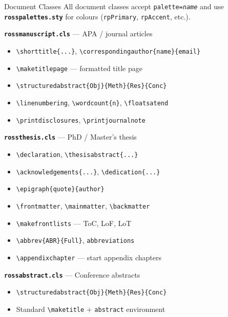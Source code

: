 \documentclass[palette=lancet]{rossbeamerscientific}
\newcommand{\cmd}[1]{\texttt{\color{rbAccent}\textbackslash #1}}
\newcommand{\env}[1]{\texttt{\color{rbSecondary}#1}}
\newcommand{\cls}[1]{\texttt{\color{rbPrimary}\bfseries #1}}
\newcommand{\opt}[1]{\texttt{\color{rbAccentDark}#1}}
\newcommand{\pkg}[1]{\texttt{\color{rbSecondary}\bfseries #1}}
\begin{document}
\begin{frame}{Document Classes}
\footnotesize
All document classes accept \opt{palette=\textit{name}} and use \pkg{rosspalettes.sty}
for colours (\texttt{rpPrimary}, \texttt{rpAccent}, etc.).
\vskip6pt
\begin{twocol}
  \textbf{\cls{rossmanuscript.cls}} --- APA / journal articles
  \begin{itemize}\setlength\itemsep{0pt}
    \item \cmd{shorttitle\{...\}}, \cmd{correspondingauthor\{name\}\{email\}}
    \item \cmd{maketitlepage} --- formatted title page
    \item \cmd{structuredabstract\{Obj\}\{Meth\}\{Res\}\{Conc\}}
    \item \cmd{linenumbering}, \cmd{wordcount\{n\}}, \cmd{floatsatend}
    \item \cmd{printdisclosures}, \cmd{printjournalnote}
  \end{itemize}
  \vskip6pt

  \textbf{\cls{rossthesis.cls}} --- PhD / Master's thesis
  \begin{itemize}\setlength\itemsep{0pt}
    \item \cmd{declaration}, \cmd{thesisabstract\{...\}}
    \item \cmd{acknowledgements\{...\}}, \cmd{dedication\{...\}}
    \item \cmd{epigraph\{quote\}\{author\}}
    \item \cmd{frontmatter}, \cmd{mainmatter}, \cmd{backmatter}
    \item \cmd{makefrontlists} --- ToC, LoF, LoT
    \item \cmd{abbrev\{ABR\}\{Full\}}, \env{abbreviations}
    \item \cmd{appendixchapter} --- start appendix chapters
  \end{itemize}
  \vskip6pt

  \textbf{\cls{rossabstract.cls}} --- Conference abstracts
  \begin{itemize}\setlength\itemsep{0pt}
    \item \cmd{structuredabstract\{Obj\}\{Meth\}\{Res\}\{Conc\}}
    \item Standard \cmd{maketitle} + \env{abstract} environment
  \end{itemize}


\end{twocol}
\end{frame}
\end{document}

